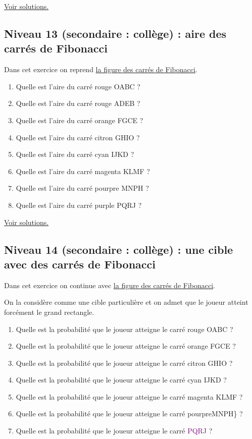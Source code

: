 \documentclass[11pt]{article}
\begin{document}
\hyperref[org629097b]{Voir solutions.}

\newpage


\subsection{Niveau 13 (secondaire : collège) : aire des carrés de Fibonacci}
\label{sec:org5198315}

\label{org2715b85}

Dans cet exercice on reprend \hyperref[org629097b]{la figure des carrés de Fibonacci}.



\begin{enumerate}
\item Quelle est l'aire du carré rouge OABC ?
\item Quelle est l'aire du carré rouge ADEB ?
\item Quelle est l'aire du carré orange FGCE ?
\item Quelle est l'aire du carré citron GHIO ?
\item Quelle est l'aire du carré cyan IJKD ?
\item Quelle est l'aire du carré magenta KLMF ?
\item Quelle est l'aire du carré pourpre MNPH ?
\item Quelle est l'aire du carré purple PQRJ ?
\end{enumerate}


\hyperref[org50613b0]{Voir solutions.}

\newpage


\subsection{Niveau 14 (secondaire : collège) : une cible avec des carrés de Fibonacci}
\label{sec:org92a3226}

\label{org7670983}

Dans cet exercice on continue avec \hyperref[org629097b]{la figure des carrés de Fibonacci}.

On la considère comme une cible particulière et on admet que le joueur
atteint forcément le grand rectangle.



\begin{enumerate}
\item Quelle est la probabilité que le joueur atteigne le carré
rouge OABC ?
\item Quelle est la probabilité que le joueur atteigne le carré
orange FGCE ?
\item Quelle est la probabilité que le joueur atteigne le carré
citron GHIO ?
\item Quelle est la probabilité que le joueur atteigne le carré
cyan IJKD ?
\item Quelle est la probabilité que le joueur atteigne le carré
magenta KLMF ?
\item Quelle est la probabilité que le joueur atteigne le carré
pourpreMNPH\} ?
\item Quelle est la probabilité que le joueur atteigne le carré
\textcolor{purple}{PQRJ} ?
\end{enumerate}
\end{document}
